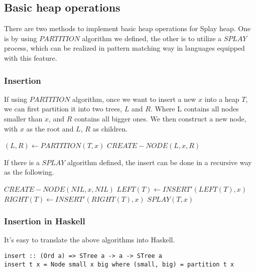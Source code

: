 \documentclass{article}
\begin{document}
\subsection{Basic heap operations}

There are two methods to implement basic heap operations for Splay
heap. One is by using $PARTITION$ algorithm we defined, the other
is to utilize a $SPLAY$ process, which can be realized in pattern matching
way in languages equipped with this feature.

\subsubsection{Insertion}

If using $PARTITION$ algorithm, once we want to insert a new $x$ into
a heap $T$, we can first partition it into two trees, $L$ and $R$. Where
L contains all nodes smaller than $x$, and $R$ contains all bigger ones.
We then construct a new node, with $x$ as the root and $L$, $R$ as children.

\begin{algorithmic}[1]
  \State $(L, R) \gets PARTITION(T, x)$
  \State \Return $CREATE-NODE(L, x, R)$
\EndFunction
\end{algorithmic}

If there is a $SPLAY$ algorithm defined, the insert can be done in a 
recursive way as the following.

\begin{algorithmic}[1]
    \State \Return $CREATE-NODE(NIL, x, NIL)$
  \EndIf
    \State $LEFT(T) \gets INSERT'(LEFT(T), x)$
  \Else
    \State $RIGHT(T) \gets INSERT'(RIGHT(T), x)$
  \EndIf
  \State \Return $SPLAY(T, x)$
\EndFunction
\end{algorithmic}

\subsubsection*{Insertion in Haskell}

It's easy to translate the above algorithms into Haskell.

\lstset{language=Haskell}
\begin{lstlisting}
insert :: (Ord a) => STree a -> a -> STree a
insert t x = Node small x big where (small, big) = partition t x
\end{lstlisting}
\end{document}

